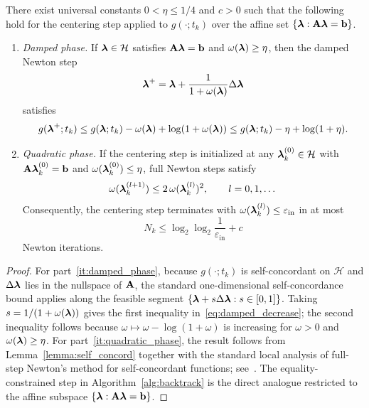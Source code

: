 \begin{theorem}\label{thm:newton_conv}
	There exist universal constants $0<\eta\leq 1/4$ and $c>0$ such that the following hold for the centering step applied to $g(\cdot;t_k)$ over the affine set $\{\boldsymbol{\lambda}:\mathbf{A}\boldsymbol{\lambda}=\mathbf{b}\}$.
	\begin{enumerate}[label=(\roman*)]
		\item \emph{Damped phase.}\label{it:damped_phase} If $\boldsymbol{\lambda}\in\mathcal{H}$ satisfies $\mathbf{A}\boldsymbol{\lambda}=\mathbf{b}$ and $\omega(\boldsymbol{\lambda})\ge\eta$, then the damped Newton step
		\begin{equation}\label{eq:damped_newton_step}
			\boldsymbol{\lambda}^+ = \boldsymbol{\lambda} + \frac{1}{1+\omega(\boldsymbol{\lambda})}\Delta\boldsymbol{\lambda}
		\end{equation}
		satisfies
		\begin{equation}\label{eq:damped_decrease}
			g(\boldsymbol{\lambda}^+;t_k) \le g(\boldsymbol{\lambda};t_k) - \omega(\boldsymbol{\lambda}) + \log(1+\omega(\boldsymbol{\lambda}))
			\le g(\boldsymbol{\lambda};t_k) - \eta + \log(1+\eta).
		\end{equation}
		\item \emph{Quadratic phase.}\label{it:quadratic_phase} If the centering step is initialized at any $\boldsymbol{\lambda}_k^{(0)}\in\mathcal{H}$ with $\mathbf{A}\boldsymbol{\lambda}_k^{(0)}=\mathbf{b}$ and $\omega(\boldsymbol{\lambda}_k^{(0)})\le\eta$, full Newton steps satisfy
		\begin{equation*}
			\omega(\boldsymbol{\lambda}_k^{(l+1)})\leq 2\,\omega(\boldsymbol{\lambda}_k^{(l)})^2,\qquad l=0,1,\dots
		\end{equation*}
		Consequently, the centering step terminates with $\omega(\boldsymbol{\lambda}_k^{(l)})\leq\varepsilon_\text{in}$ in at most
		\begin{equation}\label{eq:newton_iters}
			N_k \leq \log_2\log_2\frac{1}{\varepsilon_\text{in}} + c
		\end{equation}
		Newton iterations.
	\end{enumerate}
\end{theorem}
\begin{proof}
	For part~\ref{it:damped_phase}, because $g(\cdot;t_k)$ is self-concordant on $\mathcal{H}$ and $\Delta\boldsymbol{\lambda}$ lies in the nullspace of $\mathbf{A}$, the standard one-dimensional self-concordance bound applies along the feasible segment $\{\boldsymbol{\lambda}+s\Delta\boldsymbol{\lambda}:s\in[0,1]\}$. Taking $s=1/(1+\omega(\boldsymbol{\lambda}))$ gives the first inequality in~\eqref{eq:damped_decrease}; the second inequality follows because $\omega\mapsto \omega-\log(1+\omega)$ is increasing for $\omega>0$ and $\omega(\boldsymbol{\lambda})\ge\eta$. For part~\ref{it:quadratic_phase}, the result follows from Lemma~\ref{lemma:self_concord} together with the standard local analysis of full-step Newton's method for self-concordant functions; see~\cite[\S9.6.4]{ipm}. The equality-constrained step in Algorithm~\ref{alg:backtrack} is the direct analogue restricted to the affine subspace $\{\boldsymbol{\lambda}:\mathbf{A}\boldsymbol{\lambda}=\mathbf{b}\}$.
\end{proof}

